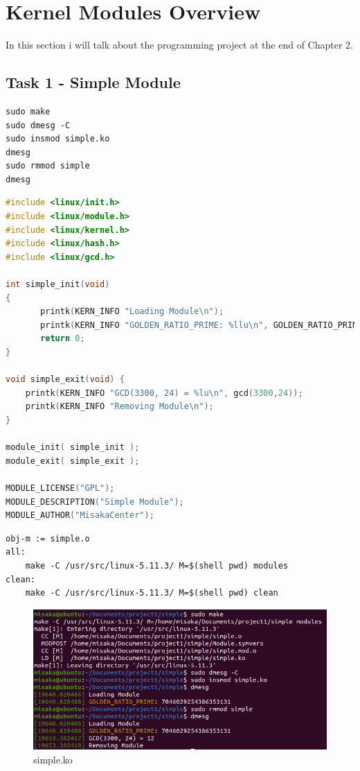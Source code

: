 \documentclass[UTF8,10pt,a4paper]{article}
\theoremstyle{Problem}
\theoremstyle{Solution}
\begin{document}
\section{Kernel Modules Overview}
In this section i will talk about the programming project at the end of Chapter 2\cite{book1}.
\subsection{Task 1 - Simple Module}

\begin{lstlisting}
sudo make
sudo dmesg -C
sudo insmod simple.ko
dmesg
sudo rmmod simple
dmesg
\end{lstlisting}

\begin{lstlisting}[language = c]
#include <linux/init.h>
#include <linux/module.h>
#include <linux/kernel.h>
#include <linux/hash.h>
#include <linux/gcd.h>

int simple_init(void)
{
       printk(KERN_INFO "Loading Module\n");
       printk(KERN_INFO "GOLDEN_RATIO_PRIME: %llu\n", GOLDEN_RATIO_PRIME);
       return 0;
}

void simple_exit(void) {
	printk(KERN_INFO "GCD(3300, 24) = %lu\n", gcd(3300,24));
	printk(KERN_INFO "Removing Module\n");
}

module_init( simple_init );
module_exit( simple_exit );

MODULE_LICENSE("GPL");
MODULE_DESCRIPTION("Simple Module");
MODULE_AUTHOR("MisakaCenter");
\end{lstlisting}

\begin{lstlisting}
obj-m := simple.o
all:
	make -C /usr/src/linux-5.11.3/ M=$(shell pwd) modules
clean:
	make -C /usr/src/linux-5.11.3/ M=$(shell pwd) clean
\end{lstlisting}

\begin{figure}[H]
    \centering
    \includegraphics[width=380pt]{simple1.png}
    \caption{simple.ko}
    \label{88}
\end{figure}
\end{document}
